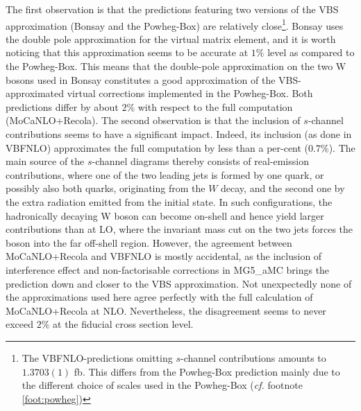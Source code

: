 The first observation is that the predictions featuring two versions
of the VBS approximation ({\sc Bonsay} and the {\sc Powheg-Box}) are
relatively close\footnote{The {\sc VBFNLO}-predictions omitting
$s$-channel contributions amounts to $1.3703(1)$ fb. This differs from
the {\sc Powheg-Box} prediction mainly due to the different choice of
scales used in the {\sc Powheg-Box} (\emph{cf.}
footnote \ref{foot:powheg})}. {\sc Bonsay} uses the double pole
approximation for the virtual matrix element, and it is worth noticing
that this approximation seems to be accurate at $1\%$ level as
compared to the {\sc Powheg-Box}. This means that the double-pole
approximation on the two W bosons used in {\sc Bonsay} constitutes a
good approximation of the VBS-approxi\-mated virtual corrections
implemented in the {\sc Powheg-Box}.  Both predictions differ by about
$2\%$ with respect to the full computation ({\sc MoCaNLO+Recola}).
The second observation is that the inclusion of $s$-channel
contributions seems to have a significant impact.  Indeed, its
inclusion (as done in {\sc VBFNLO}) approximates the full computation
by less than a per-cent ($0.7\%$). The main source of
the $s$-channel diagrams thereby consists of real-emission
contributions, where one of the two leading jets is formed by one
quark, or possibly also both quarks, originating from the $W$ decay,
and the second one by the extra radiation emitted from the initial
state. In such configurations, the hadronically decaying W boson can
become on-shell and hence yield larger contributions than at LO, where
the invariant mass cut on the two jets forces the boson into the far
off-shell region.
However, the agreement between {\sc MoCaNLO+Recola} and {\sc VBFNLO} is mostly accidental, as the inclusion of interference effect and non-factorisable corrections in {\sc MG5\_aMC} brings the prediction down and closer to the VBS approximation. Not unexpectedly none of the approximations used here agree perfectly with the full calculation of {\sc MoCaNLO\-+Recola} at NLO. Nevertheless, the disagreement seems to never exceed $2\%$ at the fiducial cross section level.


